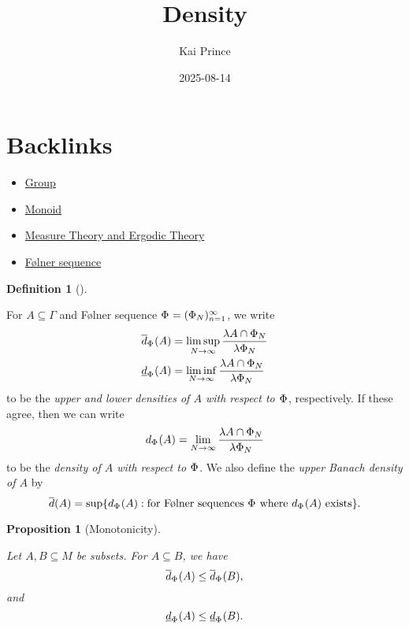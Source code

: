 \documentclass[
  british,
]{article}
\title{Density}
\author{Kai Prince}
\date{2025-08-14}
\providecommand{\tightlist}{%
  \setlength{\itemsep}{0pt}\setlength{\parskip}{0pt}}
\renewcommand*\contentsname{Table of contents}
\newcommand\contentsname{Table of contents}
\theoremstyle{definition}
\newtheorem{definition}{Definition}[section]
\theoremstyle{plain}
\theoremstyle{plain}
\newtheorem{proposition}{Proposition}[section]
\theoremstyle{remark}
\newcommand{\UpperBanachDensity}[1]{\overline{d}({#1})}
\newcommand{\Folner}[1][\vphantom{}]{{\Phi}_{#1}}
\newcommand{\UpperDensity}[2][\Folner]{\overline{d}_{{#1}}({#2})}
\newcommand{\LowerDensity}[2][\Folner]{\underline{d}_{{#1}}({#2})}
\newcommand{\CountingMeasure}{{\lambda}}
\newcommand{\Density}[2][\Folner]{d_{{#1}}({#2})}
\newcommand{\Group}{{\Gamma}}
\newcommand{\Monoid}{{M}}
\begin{document}
\maketitle

\renewcommand*\contentsname{Table of contents}
{
\hypersetup{linkcolor=}
\setcounter{tocdepth}{3}
\tableofcontents
}

\section*{Backlinks}\label{sec-Backlinks}

\begin{itemize}
\tightlist
\item
  \href{../../MathsNotes/0_Fundamental/group.html}{Group}
\item
  \href{../../MathsNotes/0_Fundamental/monoid.html}{Monoid}
\item
  \href{../../MathsNotes/2_Topological_Dynamics/measure-ergodic-theory.html}{Measure Theory and Ergodic Theory}
\item
  \href{../../MathsNotes/1_Amenable_and_Density/folner.html}{Følner sequence}
\end{itemize}

\begin{definition}[]\protect\hypertarget{def-density}{}\label{def-density}

For \(A\subseteq\Group\) and Følner sequence
\(\Folner=(\Folner[N])_{n=1}^\infty\), we write \begin{align*}
    \UpperDensity{A}&=\limsup_{N\rightarrow\infty}\frac{\CountingMeasure{A\cap\Folner[N]}}{\CountingMeasure{\Folner[N]}}
    \\\LowerDensity{A}&=\liminf_{N\rightarrow\infty}\frac{\CountingMeasure{A\cap\Folner[N]}}{\CountingMeasure{\Folner[N]}}
\end{align*} to be the \emph{upper and lower densities of \(A\) with
respect to \(\Folner\)}, respectively. If these agree, then we can write
\[
\Density{A}=\lim_{N\rightarrow\infty}\frac{\CountingMeasure{A\cap\Folner[N]}}{\CountingMeasure{\Folner[N]}}
\] to be the \emph{density of \(A\) with respect to \(\Folner\)}. We
also define the \emph{upper Banach density of \(A\)} by \[
\UpperBanachDensity{A}=\sup\{d_{\Folner}(A):\text{for Følner sequences }\Folner\text{ where }d_{\Folner}(A)\text{ exists}\}.
\]

\end{definition}

\begin{proposition}[Monotonicity]\protect\hypertarget{prp-DensityMonotonicity}{}\label{prp-DensityMonotonicity}

Let \(A,B\subseteq\Monoid\) be subsets. For \(A\subseteq B\), we
have\[\UpperDensity{A}\leq\UpperDensity{B}, \]and\[\LowerDensity{A}\leq\LowerDensity{B}. \]

\end{proposition}
\end{document}
